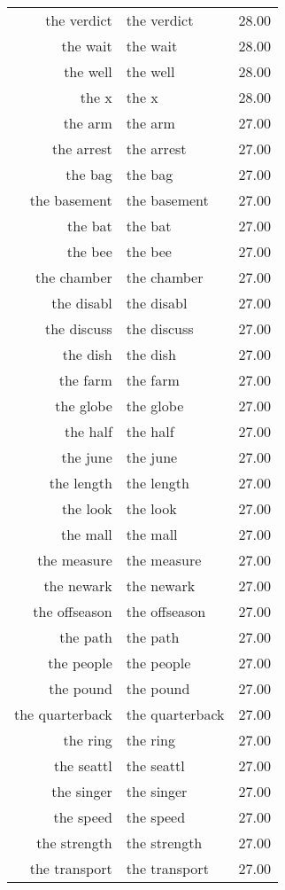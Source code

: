 \begin{table}[ht]
\begin{tabular}{rlr}
  the verdict & the verdict & 28.00 \\ 
  the wait & the wait & 28.00 \\ 
  the well & the well & 28.00 \\ 
  the x & the x & 28.00 \\ 
  the arm & the arm & 27.00 \\ 
  the arrest & the arrest & 27.00 \\ 
  the bag & the bag & 27.00 \\ 
  the basement & the basement & 27.00 \\ 
  the bat & the bat & 27.00 \\ 
  the bee & the bee & 27.00 \\ 
  the chamber & the chamber & 27.00 \\ 
  the disabl & the disabl & 27.00 \\ 
  the discuss & the discuss & 27.00 \\ 
  the dish & the dish & 27.00 \\ 
  the farm & the farm & 27.00 \\ 
  the globe & the globe & 27.00 \\ 
  the half & the half & 27.00 \\ 
  the june & the june & 27.00 \\ 
  the length & the length & 27.00 \\ 
  the look & the look & 27.00 \\ 
  the mall & the mall & 27.00 \\ 
  the measure & the measure & 27.00 \\ 
  the newark & the newark & 27.00 \\ 
  the offseason & the offseason & 27.00 \\ 
  the path & the path & 27.00 \\ 
  the people & the people & 27.00 \\ 
  the pound & the pound & 27.00 \\ 
  the quarterback & the quarterback & 27.00 \\ 
  the ring & the ring & 27.00 \\ 
  the seattl & the seattl & 27.00 \\ 
  the singer & the singer & 27.00 \\ 
  the speed & the speed & 27.00 \\ 
  the strength & the strength & 27.00 \\ 
  the transport & the transport & 27.00 \\ 

\end{tabular}
\end{table}
